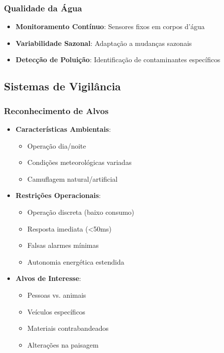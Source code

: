 \subsubsection{Qualidade da Água}
\begin{itemize}
    \item \textbf{Monitoramento Contínuo}: Sensores fixos em corpos d'água
    \item \textbf{Variabilidade Sazonal}: Adaptação a mudanças sazonais
    \item \textbf{Detecção de Poluição}: Identificação de contaminantes específicos
\end{itemize}

\subsection{Sistemas de Vigilância}

\subsubsection{Reconhecimento de Alvos}
\begin{itemize}
    \item \textbf{Características Ambientais}:
    \begin{itemize}
        \item Operação dia/noite
        \item Condições meteorológicas variadas
        \item Camuflagem natural/artificial
    \end{itemize}
    
    \item \textbf{Restrições Operacionais}:
    \begin{itemize}
        \item Operação discreta (baixo consumo)
        \item Resposta imediata (<50ms)
        \item Falsas alarmes mínimas
        \item Autonomia energética estendida
    \end{itemize}
    
    \item \textbf{Alvos de Interesse}:
    \begin{itemize}
        \item Pessoas vs. animais
        \item Veículos específicos
        \item Materiais contrabandeados
        \item Alterações na paisagem
    \end{itemize}
\end{itemize}


